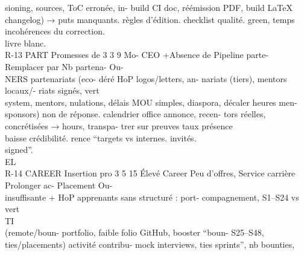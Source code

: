 sioning, sources,                        ToC erronée, in- build CI doc, réémission PDF, build LaTeX\\
changelog)     →                         puts manquants. règles d’édition. checklist qualité. green, temps\\
incohérences du                                                                                 correction.\\
livre blanc.\\
R-13       PART     Promesses       de 3 3 9   Mo- CEO      +Absence        de Pipeline parte- Remplacer par Nb partena- Ou-\\
NERS     partenariats (eco-         déré HoP      logos/letters, an- nariats    (tiers), mentors locaux/- riats signés, vert\\
system, mentors,                         nulations, délais MOU       simples, diaspora, décaler heures men-\\
sponsors)     non                        de réponse.        calendrier office annonce, recen- tors réelles,\\
concrétisées →                                              hours, transpa- trer sur preuves taux présence\\
baisse crédibilité.                                         rence “targets vs internes.          invités.\\
signed”.\\
\vspace{0.5em}
\vspace{0.5em}
\vspace{0.5em}
\vspace{0.5em}
EL\\
R-14       CAREER   Insertion     pro 3 5 15 Élevé Career     Peu       d’offres, Service carrière Prolonger      ac- Placement       Ou-\\
insuffisante                   + HoP      apprenants sans structuré : port- compagnement, S1–S24              vs vert\\
\vspace{0.5em}
\vspace{0.5em}
\vspace{0.5em}
\vspace{0.5em}
TI\\
(remote/boun-                             portfolio, faible folio      GitHub, booster “boun- S25–S48,\\
ties/placements)                          activité contribu- mock interviews, ties      sprints”, nb bounties,\\
